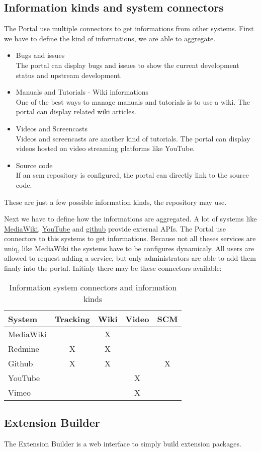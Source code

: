 \subsection[sec:information kinds and system connectors]{Information kinds and system connectors}

The Portal use multiple connectors to get informations from other systems.
First we have to define the kind of informations, we are able to aggregate.

\begin{itemize}
\item Bugs and issues\\
The portal can display bugs and issues to show the current development status and upstream development.
\item Manuals and Tutorials - Wiki informations\\
One of the best ways to manage manuals and tutorials is to use a wiki. The portal can display related wiki articles.
\item Videos and Screencasts\\
Videos and screencasts are another kind of tutorials. The portal can display videos hosted on video streaming platforms like YouTube.
\item Source code\\
If an scm repository is configured, the portal can directly link to the source code.
\end{itemize}

These are just a few possible information kinds, the repository may use.

Next we have to define how the informations are aggregated.
A lot of systems like \hyperlink{http://www.mediawiki.org/wiki/API:Main_page/de}{MediaWiki}, \hyperlink{http://code.google.com/intl/de-DE/apis/youtube/overview.html}{YouTube} and \hyperlink{http://developer.github.com/v3/}{github} provide external APIs.
The Portal use connectors to this systems to get informations.
Because not all theses services are uniq, like MediaWiki the systems have to be configures dynamicaly.
All users are allowed to request adding a service, but only administrators are able to add them finaly into the portal.
Initialy there may be these connectors available:

\small
\begin{longtable}{|p{}|c|c|c|c}
\caption{Information system connectors and information kinds} \\
\hline
\label{tab:information system connectors and information kinds}
\textbf{System} & \textbf{Tracking} & \textbf{Wiki} & \textbf{Video} & \textbf{SCM}
\\ \hline
 MediaWiki & & X & &
\\ \hline
 Redmine & X & X & &
\\ \hline
 Github & X & X & & X
\\ \hline
 YouTube & & & X &
\\ \hline
 Vimeo & & & X &
\\ \hline
\end{longtable}
\normalsize

\subsection[sec:extension builder]{Extension Builder}

The Extension Builder is a web interface to simply build extension packages.

